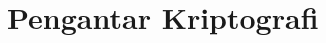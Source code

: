 \documentclass[../main.tex]{subfiles}
\begin{document}
\chapter{Pengantar Kriptografi}
\end{document}
